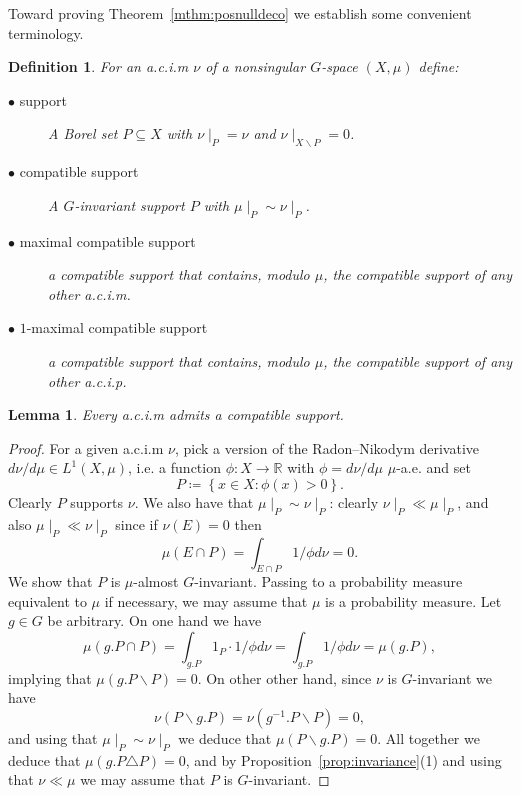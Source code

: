 \documentclass{amsart}
\numberwithin{equation}{subsection}
\newtheorem{lem}[thm]{Lemma}
\newtheorem{defn}[thm]{Definition}
\begin{document}
Toward proving Theorem~\ref{mthm:posnulldeco} we establish some convenient terminology.

\begin{defn}
For an {\sc a.c.i.m} \(\nu\) of a nonsingular \(G\)-space \(\left(X,\mu\right)\) define:
\begin{description}
    \item[\(\bullet\) support] A Borel set \(P\subseteq X\) with \(\nu\mid_{P}=\nu\) and \(\nu\mid_{X\backslash P}=0\).
    \item[\(\bullet\) compatible support] A \(G\)-invariant support \(P\) with \(\mu\mid_{P}\sim\nu\mid_{P}\).
    \item[\(\bullet\) maximal compatible support] a compatible support that contains, modulo \(\mu\), the compatible support of any other {\sc a.c.i.m}.
    \item[\(\bullet\) \(1\)-maximal compatible support] a compatible support that contains, modulo \(\mu\), the compatible support of any other {\sc a.c.i.p}.
\end{description}
\end{defn}

\begin{lem}
\label{lem:compsupp}
Every {\sc a.c.i.m} admits a compatible support.
\end{lem}

\begin{proof}
For a given {\sc a.c.i.m} \(\nu\), pick a version of the Radon--Nikodym derivative \(d\nu/d\mu\in L^{1}\left(X,\mu\right)\), i.e. a function \(\phi:X\to\mathbb{R}\) with \(\phi=d\nu/d\mu\) \(\mu\)-a.e. and set
\[P\coloneqq \left\{x\in X:\phi\left(x\right)>0\right\}.\]
Clearly \(P\) supports \(\nu\). We also have that \(\mu\mid_{P}\sim\nu\mid_{P}\): clearly \(\nu\mid_{P}\ll\mu\mid_{P}\), and also \(\mu\mid_{P}\ll\nu\mid_{P}\) since if \(\nu\left(E\right)=0\) then
\[\mu\left(E\cap P\right)=\int_{E\cap P}1/\phi d\nu=0.\]
We show that \(P\) is \(\mu\)-almost \(G\)-invariant. Passing to a probability measure equivalent to \(\mu\) if necessary, we may assume that \(\mu\) is a probability measure. Let \(g\in G\) be arbitrary. On one hand we have
\[\mu\left(g.P\cap P\right)=\int_{g.P}1_{P}\cdot1/\phi d\nu=\int_{g.P}1/\phi d\nu=\mu\left(g.P\right),\]
implying that \(\mu\left(g.P\backslash P\right)=0\). On other other hand, since \(\nu\) is \(G\)-invariant we have
\[\nu\left(P\backslash g.P\right)=\nu\left(g^{-1}.P\backslash P\right)=0,\]
and using that \(\mu\mid_{P}\sim\nu\mid_{P}\) we deduce that \(\mu\left(P\backslash g.P\right)=0\). All together we deduce that \(\mu\left(g.P\triangle P\right)=0\), and by Proposition~\ref{prop:invariance}(1) and using that \(\nu\ll\mu\) we may assume that \(P\) is \(G\)-invariant.
\end{proof}
\end{document}

